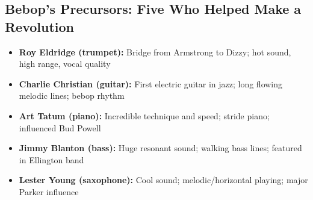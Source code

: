 \documentclass[11pt, letterpaper]{article}
\begin{document}
\subsection{Bebop's Precursors: Five Who Helped Make a Revolution}
\begin{itemize}
    \item \textbf{Roy Eldridge (trumpet):} Bridge from Armstrong to Dizzy; hot sound, high range, vocal quality
    \item \textbf{Charlie Christian (guitar):} First electric guitar in jazz; long flowing melodic lines; bebop rhythm
    \item \textbf{Art Tatum (piano):} Incredible technique and speed; stride piano; influenced Bud Powell
    \item \textbf{Jimmy Blanton (bass):} Huge resonant sound; walking bass lines; featured in Ellington band
    \item \textbf{Lester Young (saxophone):} Cool sound; melodic/horizontal playing; major Parker influence
\end{itemize}
\end{document}
